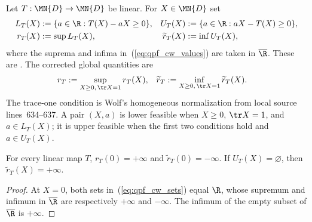 \begin{definition}
    \label{def:collatz_wielandt_feasible}
    \leanok
    Let $T:\MN{D}\to\MN{D}$ be linear. For $X\in\MN{D}$ set
    \begin{align}
        L_T(X)
        &:=\{a\in\R:T(X)-aX\geq0\},
        &
        U_T(X)
        &:=\{a\in\R:aX-T(X)\geq0\},
        \label{eq:qpf_cw_sets}\\
        r_T(X)
        &:=\sup L_T(X),
        &
        \widetilde r_T(X)
        &:=\inf U_T(X),
        \label{eq:qpf_cw_values}
    \end{align}
    where the suprema and infima in~(\ref{eq:qpf_cw_values}) are taken in
    $\overline{\R}$. These are
    \cite[Equations~(6.29)--(6.30)]{Wolf2012Quantum}. The corrected global
    quantities are
    \begin{align}
        r_T
        &:=\sup_{X\geq0,\,\tr X=1}r_T(X),
        &
        \widetilde r_T
        &:=\inf_{X\geq0,\,\tr X=1}\widetilde r_T(X).
        \label{eq:qpf_cw_global_values}
    \end{align}
    The trace-one condition is Wolf's homogeneous normalization from local
    source lines~634--637. A pair $(X,a)$ is lower feasible when
    $X\geq0$, $\tr X=1$, and $a\in L_T(X)$; it is upper feasible when the
    first two conditions hold and $a\in U_T(X)$.
\end{definition}

\begin{theorem}
    \label{thm:collatz_wielandt_boundaries}
    \leanok
    For every linear map $T$,
    $r_T(0)=+\infty$ and $\widetilde r_T(0)=-\infty$. If
    $U_T(X)=\varnothing$, then $\widetilde r_T(X)=+\infty$.
\end{theorem}

\begin{proof}\leanok
    At $X=0$, both sets in~(\ref{eq:qpf_cw_sets}) equal $\R$, whose supremum
    and infimum in $\overline{\R}$ are respectively $+\infty$ and $-\infty$.
    The infimum of the empty subset of $\overline{\R}$ is $+\infty$.
\end{proof}

